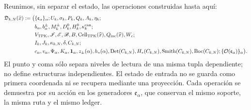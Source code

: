 Reunimos, sin separar el estado, las operaciones construidas hasta aquí:
\begin{equation}
\label{eq:pdfv2-cor-constructor-unico}
 \begin{aligned}
 \mathfrak D_{k,N}(\widehat x):=\bigl(&
 \{\mathfrak e_\alpha\}_\alpha;
 U_k,\sigma_k,P_k,Q_k,A_k,\eta_k;\\
 &b_\alpha,b_\alpha^\pm,M_k^\pm,D_k^0,H_k^0,
 \kappa_k^{\rm can};\\
 &V_{\rm TPK},\mathscr I,\mathscr E,\mathscr B,B,
 \operatorname{Cell}_{\rm TPK}(\widehat x),Q_{\rm inc}(\widehat x),W_c;\\
 &I_k,J_k,\kappa_{k,N},\delta,C_{k,N};\\
 &c_\alpha,v_\alpha,\Psi_\alpha,K_\alpha,
 \mathbf1_\alpha,z_\pm(\alpha),h_*(\alpha),
 \operatorname{Det}(C_{k,N}),H_*(C_{k,N}),
 \operatorname{Smith}(C_{k,N}),\operatorname{Boc}(C_{k,N})
 ;\{\mathcal O(\mathfrak e_\alpha)\}_\alpha
 \bigr).
 \end{aligned}
\end{equation}
El punto y coma sólo separa niveles de lectura de una misma tupla dependiente;
no define estructuras independientes. El estado de entrada no se guarda como
primera coordenada ni se recupera mediante una proyección. Cada operación se
demuestra por su acción en los generadores \(\mathfrak e_\alpha\), que
conservan el mismo soporte, la misma ruta y el mismo ledger.

